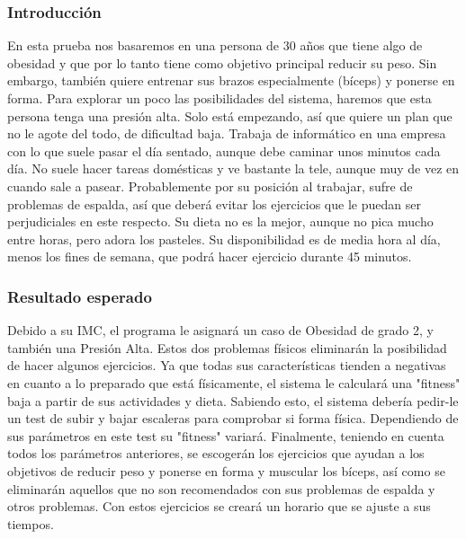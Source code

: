 \documentclass[a4paper, 12pt, UTF8]{article}
\begin{document}
\subsubsection{Introducción}
En esta prueba nos basaremos en una persona de 30 años que tiene algo de obesidad y que por lo tanto tiene como objetivo principal reducir su peso. Sin embargo, también quiere entrenar sus brazos especialmente (bíceps) y ponerse en forma.
Para explorar un poco las posibilidades del sistema, haremos que esta persona tenga una presión alta. Solo está empezando, así que quiere un plan que no le agote del todo, de dificultad baja.
Trabaja de informático en una empresa con lo que suele pasar el día sentado, aunque debe caminar unos minutos cada día. No suele hacer tareas domésticas y ve bastante la tele, aunque muy de vez en cuando sale a pasear.
Probablemente por su posición al trabajar, sufre de problemas de espalda, así que deberá evitar los ejercicios que le puedan ser perjudiciales en este respecto.
Su dieta no es la mejor, aunque no pica mucho entre horas, pero adora los pasteles. Su disponibilidad es de media hora al día, menos los fines de semana, que podrá hacer ejercicio durante 45 minutos.

\subsubsection{Resultado esperado}
Debido a su IMC, el programa le asignará un caso de Obesidad de grado 2, y también una Presión Alta. Estos dos problemas físicos eliminarán la posibilidad de hacer algunos ejercicios. 
Ya que todas sus características tienden a negativas en cuanto a lo preparado que está físicamente, el sistema le calculará una "fitness" baja a partir de sus actividades y dieta.
Sabiendo esto, el sistema debería pedir-le un test de subir y bajar escaleras para comprobar si forma física. Dependiendo de sus parámetros en este test su "fitness" variará.
Finalmente, teniendo en cuenta todos los parámetros anteriores, se escogerán los ejercicios que ayudan a los objetivos de reducir peso y ponerse en forma y muscular los bíceps, así como se eliminarán aquellos que no son recomendados con sus problemas de espalda y otros problemas.
Con estos ejercicios se creará un horario que se ajuste a sus tiempos.
\end{document}
